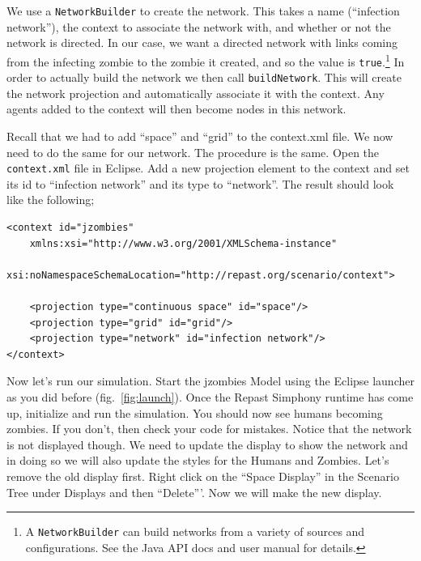 \documentclass[11pt]{amsart}
\begin{document}
We use a \texttt{NetworkBuilder} to create the network. This takes a name (``infection network''), the context to associate the network with, and whether or not the network is directed. In our case, we want a directed network with links coming from the infecting zombie to the zombie it created, and so the value is \texttt{true}.\footnote{A \texttt{NetworkBuilder} can build networks from a variety of sources and configurations. See the Java API docs and user manual for details.} In order to actually build the network we then call \texttt{buildNetwork}. This will create the network projection and automatically associate it with the context. Any agents added to the context will then become nodes in this network.

Recall that we had to add ``space'' and ``grid'' to the context.xml file. We now need to do the same for our network. The procedure is the same. Open the \texttt{context.xml} file in Eclipse. Add a new projection element to the context and set its id to ``infection network'' and its type to ``network''. The result should look like the following;

\noindent\begin{minipage}[h]{\textwidth}
\vspace{.2in}
\lstset{language=java,caption=}
\begin{lstlisting}
<context id="jzombies"
	xmlns:xsi="http://www.w3.org/2001/XMLSchema-instance"
	xsi:noNamespaceSchemaLocation="http://repast.org/scenario/context">
	
	<projection type="continuous space" id="space"/>
	<projection type="grid" id="grid"/>
	<projection type="network" id="infection network"/>
</context>

\end{lstlisting}
\vspace{.2in}
\end{minipage}

Now let's run our simulation. Start the jzombies Model using the Eclipse launcher as you did before (fig.~\ref{fig:launch}). Once the Repast Simphony runtime has come up, initialize and run the simulation. You should now see humans becoming zombies. If you don't, then check your code for mistakes. Notice that the network is not displayed though. We need to update the display to show the network and in doing so we will also update the styles for the Humans and Zombies. Let's remove the old display first. Right click on the ``Space Display'' in the Scenario Tree under Displays and then ``Delete'''. Now we will make the new display.
\end{document}
